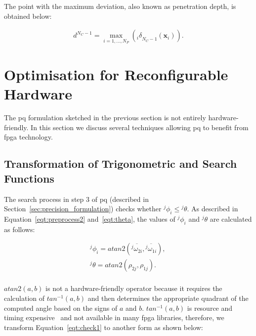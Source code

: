 The point with the maximum deviation, also known as penetration depth, is obtained below:

\begin{equation}
\begin{aligned}
d^{N_C-1} = \max_{i=1,...,N_P} \left ( {_i\delta}_{N_C-1}(\textbf{x}_i) \right ) \mbox{.}
\end{aligned}
\label{eqt:dev_max}
\end{equation}


\section{Optimisation for Reconfigurable Hardware}
\label{sec:precision_optimisation}

The \gls{pq} formulation sketched in the previous section is not entirely hardware-friendly.
In this section we discuss several techniques allowing \gls{pq} to benefit from \gls{fpga} technology.

\subsection{Transformation of Trigonometric and Search Functions}
\label{sec:precision_trigo}
The search process in step 3 of \gls{pq} (described in Section~\ref{sec:precision_formulation}) checks whether \linebreak ${^j\phi}_i \le {^j\theta}$.
As described in Equation~\ref{eqt:preprocess2} and~\ref{eqt:theta}, the values of ${^j\phi}_i$ and ${^j\theta}$ are calculated as follows:

\begin{equation}
\begin{aligned}
{^j\phi}_i = atan2 \left ( \overline{{^j\omega}_{2i}},\overline{{^j\omega}_{1i}} \right ) \mbox{, } \\
{^j\theta} = atan2 \left ( \rho_{2j},\rho_{1j} \right ) \mbox{.} \\
\end{aligned}
\label{eqt:check1}
\end{equation}

$atan2(a,b)$ is not a hardware-friendly operator because it requires the calculation of $tan^{-1}(a,b)$ and then determines the appropriate quadrant of the computed angle based on the signs of $a$ and $b$.
$tan^{-1}(a,b)$ is resource and timing expensive~\cite{altera_megafunctions} and not available in many \gls{fpga} libraries, therefore, we transform Equation~\ref{eqt:check1} to another form as shown below:

